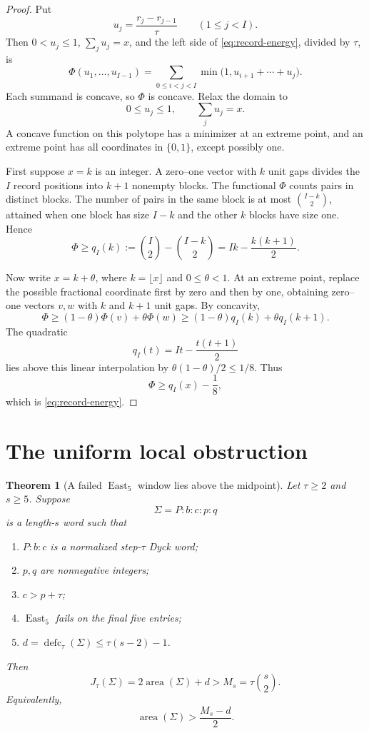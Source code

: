 \documentclass[11pt]{article}
\newtheorem{theorem}{Theorem}
\theoremstyle{definition}
\theoremstyle{remark}
\newcommand{\area}{\operatorname{area}}
\newcommand{\defc}{\operatorname{defc}}
\newcommand{\East}{\operatorname{East}}
\begin{document}
\begin{proof}
Put
\[
  u_j=\frac{r_j-r_{j-1}}{\tau}
  \qquad(1\le j<I).
\]
Then \(0<u_j\le1\), \(\sum_j u_j=x\), and the left side of
\eqref{eq:record-energy}, divided by \(\tau\), is
\[
  \Phi(u_1,\ldots,u_{I-1})
  =\sum_{0\le i<j<I}
   \min\bigl(1,u_{i+1}+\cdots+u_j\bigr).
\]
Each summand is concave, so \(\Phi\) is concave.  Relax the domain to
\[
  0\le u_j\le1,
  \qquad \sum_j u_j=x.
\]
A concave function on this polytope has a minimizer at an extreme point,
and an extreme point has all coordinates in \(\{0,1\}\), except possibly
one.

First suppose \(x=k\) is an integer.  A zero--one vector with \(k\) unit
gaps divides the \(I\) record positions into \(k+1\) nonempty blocks.
The functional \(\Phi\) counts pairs in distinct blocks.  The number of
pairs in the same block is at most \(\binom{I-k}{2}\), attained when one
block has size \(I-k\) and the other \(k\) blocks have size one.  Hence
\[
  \Phi\ge q_I(k):=\binom I2-\binom{I-k}{2}
  =Ik-\frac{k(k+1)}2.
\]

Now write \(x=k+\theta\), where \(k=\lfloor x\rfloor\) and
\(0\le\theta<1\).  At an extreme point, replace the possible fractional
coordinate first by zero and then by one, obtaining zero--one vectors
\(v,w\) with \(k\) and \(k+1\) unit gaps.  By concavity,
\[
  \Phi\ge(1-\theta)\Phi(v)+\theta\Phi(w)
  \ge(1-\theta)q_I(k)+\theta q_I(k+1).
\]
The quadratic
\[
  q_I(t)=It-\frac{t(t+1)}2
\]
lies above this linear interpolation by
\(\theta(1-\theta)/2\le1/8\).  Thus
\[
  \Phi\ge q_I(x)-\frac18,
\]
which is \eqref{eq:record-energy}.
\end{proof}

\section{The uniform local obstruction}

\begin{theorem}[A failed \(\East_5\) window lies above the midpoint]
\label{thm:local-obstruction}
Let \(\tau\ge2\) and \(s\ge5\).  Suppose
\[
  \Sigma=P:b:c:p:q
\]
is a length-\(s\) word such that
\begin{enumerate}[label=\textup{(\roman*)}]
  \item \(P:b:c\) is a normalized step-\(\tau\) Dyck word;
  \item \(p,q\) are nonnegative integers;
  \item \(c>p+\tau\);
  \item \(\East_5\) fails on the final five entries;
  \item \(d=\defc_\tau(\Sigma)\le\tau(s-2)-1\).
\end{enumerate}
Then
\begin{equation}
  J_\tau(\Sigma)=2\area(\Sigma)+d>M_s=\tau\binom{s}{2}.
  \label{eq:local-conclusion}
\end{equation}
Equivalently,
\[
  \area(\Sigma)>\frac{M_s-d}{2}.
\]
\end{theorem}
\end{document}
